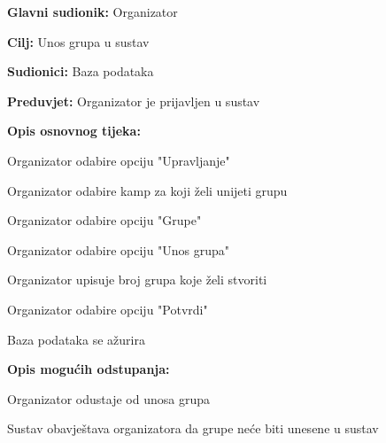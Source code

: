 					\noindent {}
					\begin{packed_item}
						
						\item \textbf{Glavni sudionik: }Organizator
						\item  \textbf{Cilj:} Unos grupa u sustav
						\item  \textbf{Sudionici:} Baza podataka
						\item  \textbf{Preduvjet:} Organizator je prijavljen u sustav
						\item  \textbf{Opis osnovnog tijeka:}
						
						\item[] \begin{packed_enum}
							
							
							\item Organizator odabire opciju "Upravljanje"
							\item Organizator odabire kamp za koji želi unijeti grupu
							\item Organizator odabire opciju "Grupe"
							\item Organizator odabire opciju "Unos grupa"
							\item Organizator upisuje broj grupa koje želi stvoriti
							\item Organizator odabire opciju "Potvrdi"
							\item Baza podataka se ažurira
						\end{packed_enum}
						
						\item  \textbf{Opis mogućih odstupanja:}
						
						\item[] \begin{packed_item}
							
							\item[4.a] Organizator odustaje od unosa grupa
							\item[] \begin{packed_enum}
								
								\item Sustav obavještava organizatora da grupe neće biti unesene u sustav
								
							\end{packed_enum}
							
							
						\end{packed_item}
					\end{packed_item}
					

